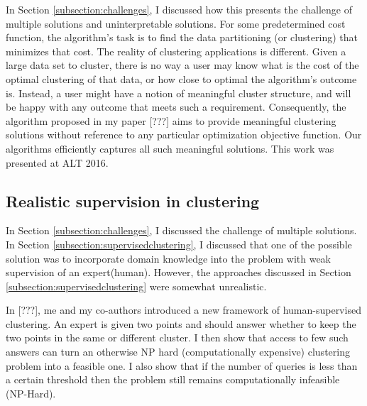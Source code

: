 \documentclass[11pt]{article}
\begin{document}
In Section \ref{subsection:challenges}, I discussed how this presents the challenge of multiple solutions and uninterpretable solutions. For some predetermined cost function, the algorithm's task is to find the data partitioning (or clustering) that minimizes that cost. The reality of clustering applications is different. Given a large data set to cluster, there is no way a user may know what is the cost of the optimal clustering of that data, or how close to optimal the algorithm's outcome is. Instead, a user might have a notion of meaningful cluster structure, and will be happy with any outcome that meets such a requirement. Consequently, the algorithm proposed in my paper {\color{red} [???]} aims to provide meaningful clustering solutions without reference to any particular optimization objective function. Our algorithms efficiently captures all such meaningful solutions. This work was presented at ALT 2016. 


\subsection{Realistic supervision in clustering}
In Section \ref{subsection:challenges}, I discussed the challenge of multiple solutions. In Section \ref{subsection:supervisedclustering}, I discussed that one of the possible solution was to incorporate domain knowledge into the problem with weak supervision of an expert(human). However, the approaches discussed in Section \ref{subsection:supervisedclustering} were somewhat unrealistic. 

In {\color{red} [???]}, me and my co-authors introduced a new framework of human-supervised clustering. An expert is given two points and should answer whether to keep the two points in the same or different cluster. I then show that access to few such answers can turn an otherwise NP hard (computationally expensive) clustering problem into a feasible one. I also show that if the number of queries is less than a certain threshold then the problem still remains computationally infeasible (NP-Hard). 
\end{document}
